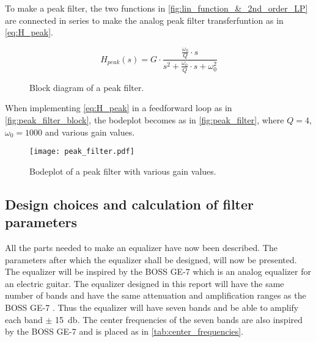 To make a peak filter, the two functions in \autoref{fig:lin_function_&_2nd_order_LP} are connected in series to make the analog peak filter transferfuntion as in \autoref{eq:H_peak}.

\begin{equation}\label{eq:H_peak}
        H_{peak}(s) = G \cdot \frac{\frac{\omega_0}{Q}\cdot s}{s^2+\frac{\omega_0}{Q}\cdot s + \omega_0^2}
    \end{equation}
    
    \startexplain
    \stopexplain

\begin{figure}[!h]
\centering
\def\svgwidth{\columnwidth}

\caption{Block diagram of a peak filter.}
		\label{fig:peak_filter_block}
\end{figure}

When implementing \autoref{eq:H_peak} in a feedforward loop as in \autoref{fig:peak_filter_block}, the bodeplot becomes as in \autoref{fig:peak_filter}, where $Q = 4$, $\omega_0 = 1000$ and various gain values. 



\begin{figure}[!h]
    \centering
        \texttt{[image: peak\_filter.pdf]}
        \caption{Bodeplot of a peak filter with various gain values.}
        \label{fig:peak_filter}
  \end{figure} 
  
\subsection{Design choices and calculation of filter parameters}
All the parts needed to make an equalizer have now been described. The parameters after which the equalizer shall be designed, will now be presented. 
The equalizer will be inspired by the BOSS GE-7 which is an analog equalizer for an electric guitar. The equalizer designed in this report will have the same number of bands and have the same attenuation and amplification ranges as the BOSS GE-7 \citep{Boss_GE7}. Thus the equalizer will have seven bands and be able to amplify each band $\pm$ \SI{15}{\decibel}.
The center frequencies of the seven bands are also inspired by the BOSS GE-7 and is placed as in \autoref{tab:center_frequencies}.

